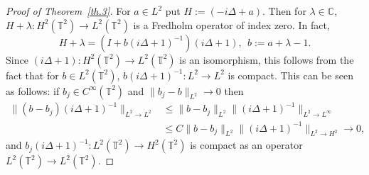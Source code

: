 \documentclass[11pt]{article}
\theoremstyle{definition}
\numberwithin{equation}{section}
\numberwithin{figure}{section}
\numberwithin{table}{section}
\newcommand{\CC}{{\mathbb C}}
\newcommand{\TT}{{\mathbb T}}
\begin{document}
\begin{proof}[Proof of Theorem~\ref{th.3}]
For $a \in L^2$ put $H := (- i \Delta +a)$. Then for $ \lambda \in \CC $, $ H + \lambda : H^2 (\TT^2) \to L^2 (\TT^2) $ is a Fredholm operator of index zero. In fact,
\[
H + \lambda = (I + b (i \Delta + 1)^{-1}) (i \Delta + 1), \ \ b:= a + \lambda - 1.
\]
Since $ (i \Delta + 1) :H^2 (\TT^2) \to L^2 (\TT^2) $ is an isomorphism, this follows from the fact that for $ b \in L^2 (\TT^2) $, $ b (i \Delta + 1)^{-1} : L^2 \to L^2 $ is compact. This can be seen as follows: if $ b_j \in C^\infty (\TT^2) $ and $ \| b_j - b\|_{L^2 } \to 0 $ then
\[
\begin{split} \| (b - b_j) (i \Delta +1)^{-1} \|_{ L^2 \to L^2 } & \leq
\| b - b_j \|_{ L^2 } \| (i \Delta + 1)^{-1} \|_{ L^2 \to L^\infty } \\
&
\leq C \| b - b_j \|_{ L^2 } \| (i \Delta + 1)^{-1} \|_{ L^2 \to H^2 }
\to 0,
\end{split}
\]
and $ b_j (i \Delta + 1)^{-1} : L^2 (\TT^2) \to H^2 (\TT^2) $ is compact as an operator $ L^2 (\TT^2)\to L^2 (\TT^2) $.



\end{proof}
\end{document}
